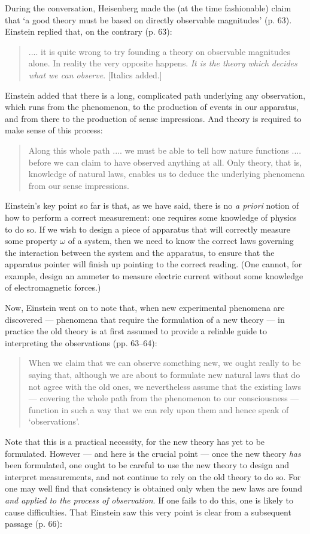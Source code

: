 \documentclass{article}%
\begin{document}
During the conversation, Heisenberg made the (at the time fashionable) claim
that `a good theory must be based on directly observable magnitudes' (p. 63).
Einstein replied that, on the contrary (p. 63):

\begin{quote}
.... it is quite wrong to try founding a theory on observable magnitudes
alone. In reality the very opposite happens. \textit{It is the theory which
decides what we can observe}. [Italics added.]
\end{quote}
Einstein added that there is a long, complicated path underlying any
observation, which runs from the phenomenon, to the production of events in
our apparatus, and from there to the production of sense impressions. And
theory is required to make sense of this process:

\begin{quote}
Along this whole path .... we must be able to tell how nature functions ....
before we can claim to have observed anything at all. Only theory, that is,
knowledge of natural laws, enables us to deduce the underlying phenomena from
our sense impressions.
\end{quote}
Einstein's key point so far is that, as we have said, there is no
\textit{a priori} notion of how to perform a correct measurement: one requires
some knowledge of physics to do so. If we wish to design a piece of apparatus
that will correctly measure some property $\omega$ of a system, then we need
to know the correct laws governing the interaction between the system and the
apparatus, to ensure that the apparatus pointer will finish up pointing to the
correct reading. (One cannot, for example, design an ammeter to measure
electric current without some knowledge of electromagnetic forces.)

Now, Einstein went on to note that, when new experimental phenomena are
discovered --- phenomena that require the formulation of a new theory --- in
practice the old theory is at first assumed to provide a reliable guide to
interpreting the observations (pp. 63--64):

\begin{quote}
When we claim that we can observe something new, we ought really to be saying
that, although we are about to formulate new natural laws that do not agree
with the old ones, we nevertheless assume that the existing laws --- covering
the whole path from the phenomenon to our consciousness --- function in such a
way that we can rely upon them and hence speak of `observations'.
\end{quote}
Note that this is a practical necessity, for the new theory has yet to
be formulated. However --- and here is the crucial point --- once the new
theory \textit{has} been formulated, one ought to be careful to use the new
theory to design and interpret measurements, and not continue to rely on the
old theory to do so. For one may well find that consistency is obtained only
when the new laws are found \textit{and applied to the process of
observation}. If one fails to do this, one is likely to cause difficulties.
That Einstein saw this very point is clear from a subsequent passage (p. 66):
\end{document}
